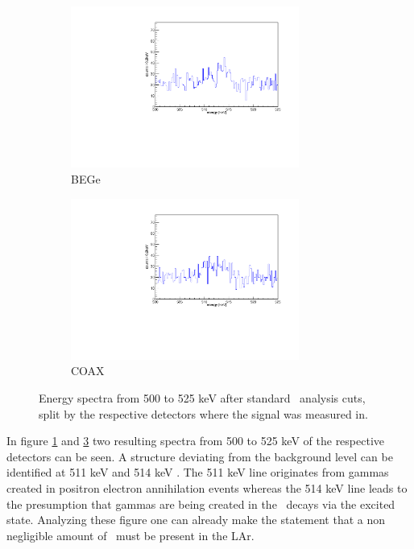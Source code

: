 \documentclass[encoding=utf8,british]{tumphthesis}
\begin{document}
\begin{figure}[t!]
\centering
\begin{subfigure}{.475\textwidth}
  \centering
	\includegraphics[width=75mm]{./Bilder/500525NoFilterBEGes.pdf}

  \caption{BEGe}
    \label{fig:NoFilterBEGes}
\end{subfigure}\hfill%
\begin{subfigure}{.475\textwidth}
  \centering
	\includegraphics[width=75mm]{./Bilder/500525NoFilterCOAX.pdf}
  \caption{COAX}
  \label{fig:NoFilterCOAX}
\end{subfigure}
	\caption{Energy spectra from 500 to 525 keV after standard \gerda\ analysis cuts, split by the respective detectors where the signal was measured in.}
			\vspace{5mm}
\end{figure}

In figure \ref{fig:NoFilterBEGes} and \ref{fig:NoFilterCOAX} two resulting spectra from 500 to 525 keV of the respective detectors can be seen.
A structure deviating from the background level can be identified  at 511 keV and 514 keV .
The 511 keV line originates from gammas created in positron electron annihilation events whereas the 514 keV line leads to the presumption that gammas are being created in the \Kr\ decays via the excited  state.
Analyzing these figure one can already make the statement that a non negligible amount of \Kr\ must be present in the LAr.
\\
\end{document}
